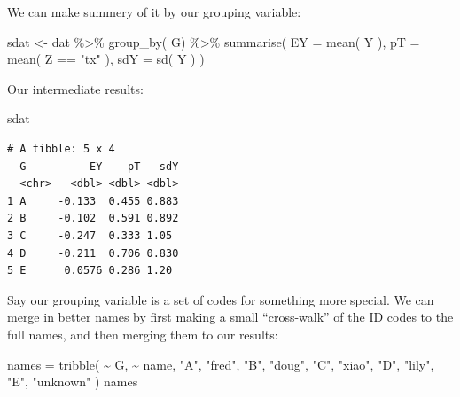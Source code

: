 \documentclass[
  letterpaper,
  DIV=11,
  numbers=noendperiod]{scrreprt}
\newenvironment{Shaded}{}{}
\newcommand{\AttributeTok}[1]{\textcolor[rgb]{0.49,0.56,0.16}{#1}}
\newcommand{\FunctionTok}[1]{\textcolor[rgb]{0.02,0.16,0.49}{#1}}
\newcommand{\NormalTok}[1]{#1}
\newcommand{\OtherTok}[1]{\textcolor[rgb]{0.00,0.44,0.13}{#1}}
\newcommand{\SpecialCharTok}[1]{\textcolor[rgb]{0.25,0.44,0.63}{#1}}
\newcommand{\StringTok}[1]{\textcolor[rgb]{0.25,0.44,0.63}{#1}}
\begin{document}
We can make summery of it by our grouping variable:

\begin{Shaded}
\begin{Highlighting}[]
\NormalTok{sdat }\OtherTok{\textless{}{-}}\NormalTok{ dat }\SpecialCharTok{\%\textgreater{}\%} \FunctionTok{group\_by}\NormalTok{( G) }\SpecialCharTok{\%\textgreater{}\%}
    \FunctionTok{summarise}\NormalTok{( }\AttributeTok{EY =} \FunctionTok{mean}\NormalTok{( Y ),}
               \AttributeTok{pT =} \FunctionTok{mean}\NormalTok{( Z }\SpecialCharTok{==} \StringTok{"tx"}\NormalTok{ ),}
               \AttributeTok{sdY =} \FunctionTok{sd}\NormalTok{( Y ) )}
\end{Highlighting}
\end{Shaded}

Our intermediate results:

\begin{Shaded}
\begin{Highlighting}[]
\NormalTok{sdat}
\end{Highlighting}
\end{Shaded}

\begin{verbatim}
# A tibble: 5 x 4
  G          EY    pT   sdY
  <chr>   <dbl> <dbl> <dbl>
1 A     -0.133  0.455 0.883
2 B     -0.102  0.591 0.892
3 C     -0.247  0.333 1.05 
4 D     -0.211  0.706 0.830
5 E      0.0576 0.286 1.20 
\end{verbatim}

Say our grouping variable is a set of codes for something more special.
We can merge in better names by first making a small ``cross-walk'' of
the ID codes to the full names, and then merging them to our results:

\begin{Shaded}
\begin{Highlighting}[]
\NormalTok{names }\OtherTok{=} \FunctionTok{tribble}\NormalTok{( }\SpecialCharTok{\textasciitilde{}}\NormalTok{ G, }\SpecialCharTok{\textasciitilde{}}\NormalTok{ name,}
                 \StringTok{"A"}\NormalTok{, }\StringTok{"fred"}\NormalTok{,}
                 \StringTok{"B"}\NormalTok{, }\StringTok{"doug"}\NormalTok{,}
                 \StringTok{"C"}\NormalTok{, }\StringTok{"xiao"}\NormalTok{,}
                 \StringTok{"D"}\NormalTok{, }\StringTok{"lily"}\NormalTok{,}
                 \StringTok{"E"}\NormalTok{, }\StringTok{"unknown"}\NormalTok{ )}
\NormalTok{names}
\end{Highlighting}
\end{Shaded}
\end{document}
